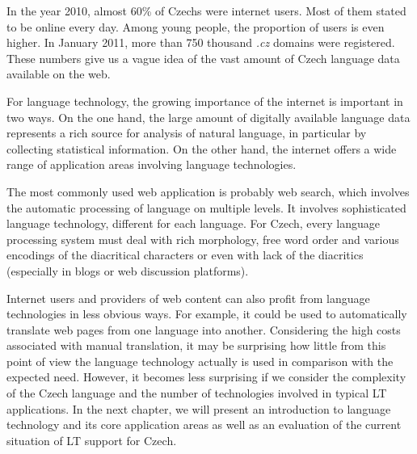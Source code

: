 \begin{multicols}{2}
In the year 2010, almost 60\% of Czechs were internet users. Most of them stated to be online every day. Among young people, the proportion of users is even higher. In January 2011, more than 750 thousand \emph{.cz} domains were registered. These numbers give us a vague idea of the vast amount of Czech language data available on the web.

For language technology, the growing importance of the internet is important in two ways. On the one hand, the large amount of digitally available language data represents a rich source for analysis of natural language, in particular by collecting statistical information. On the other hand, the internet offers a wide range of application areas involving language technologies.

The most commonly used web application is probably web search, which involves the automatic processing of language on multiple levels. It involves sophisticated language technology, different for each language. For Czech, every language processing system must deal with rich morphology, free word order and various encodings of the diacritical characters or even with lack of the diacritics (especially in blogs or web discussion platforms).

Internet users and providers of web content can also profit from language technologies in less obvious ways. For example, it could be used to automatically translate web pages from one language into another.  Considering the high costs associated with manual translation, it may be surprising how little from this point of view the language technology actually is used in comparison with the expected need. However, it becomes less surprising if we consider the complexity of the Czech language and the number of technologies involved in typical LT applications. In the next chapter, we will present an introduction to language technology and its core application areas as well as an evaluation of the current situation of LT support for Czech.
\end{multicols}
\clearpage

